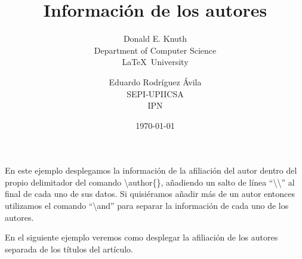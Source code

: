 \documentclass[10pt,letterpaper]{article}
\title{Información de los autores}
\author{Donald E. Knuth\\
		Department of Computer Science\\
		\LaTeX\ University \and  Eduardo Rodríguez Ávila\\SEPI-UPIICSA\\IPN}
\date{\today}
\begin{document}
\maketitle
En este ejemplo desplegamos la información de la afiliación del autor dentro del propio delimitador del comando \textbackslash author\{\}, añadiendo un salto de línea ``\textbackslash\textbackslash'' al final de cada uno de sus datos. Si quisiéramos añadir más de un autor entonces utilizamos el comando ``\textbackslash and'' para separar la información de cada uno de los autores.

En el siguiente ejemplo veremos como desplegar la afiliación de los autores separada de los títulos del artículo.
\end{document}
